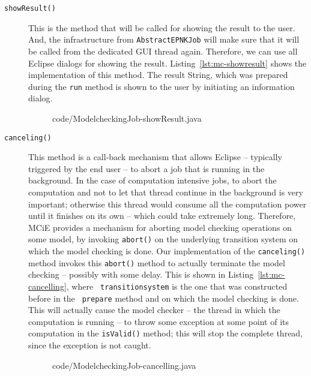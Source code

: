 \begin{description}
\item[{\tt showResult()}] This is the method that will be called for showing
     the result to the user. And, the infrastructure from {\tt AbstractEPNKJob}
     will make sure that it will be called from the dedicated GUI thread again.
     Therefore, we can use all Eclipse dialogs for showing the result. 
     Listing~\ref{lst:mc-showresult} shows the implementation of this method.
     The result String, which was prepared during the {\tt run} method is
     shown to the user by initiating an information dialog.
\begin{figure}[tbp!] %
%
{code/ModelcheckingJob-showResult.java}
\end{figure}

\item[{\tt canceling()}] This method is a call-back mechanism that allows
     Eclipse -- typically triggered by the end user -- to abort a job that is
     running in the background.
     In the case of computation intensive jobs, to abort the
     computation and not to let that thread continue in the background is very
     important; otherwise this thread would consume all the computation power
     until it finishes on its own -- which could take extremely long. Therefore,
     MCiE provides a mechanism for aborting model checking operations on some
     model, by invoking {\tt abort()} on the underlying transition system on
     which the model checking is done. Our
     implementation of the {\tt canceling()} method invokes this {\tt abort()}
     method to actually terminate the model checking -- possibly with some
     delay. This is shown in Listing~\ref{lst:mc-cancelling}, where {\tt
     transitionsystem} is the one that was constructed before in the {\tt
     prepare} method and on which the model checking is done. This will actually
     cause the model checker -- the thread in which the computation is
     running -- to throw some exception at some
     point of its computation in the {\tt isValid()} method; this will stop
     the complete thread, since the exception is not caught.
%
\begin{figure}[tbp!] %
%
{code/ModelcheckingJob-cancelling.java}  
\end{figure}
\end{description}

